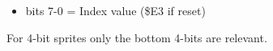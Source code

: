 \begin{itemize}
\item bits 7-0 = Index value (\$E3 if reset)
\end{itemize}
For 4-bit sprites only the bottom 4-bits are relevant.


